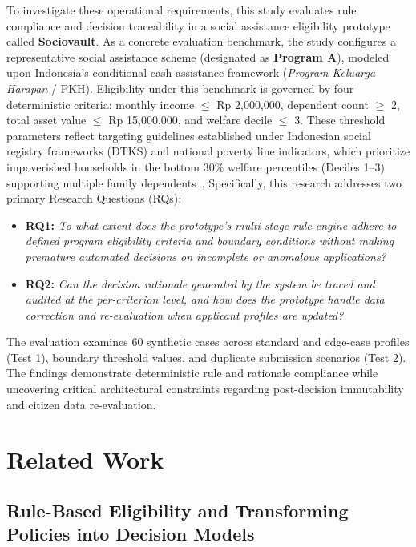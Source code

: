 \documentclass[runningheads]{llncs}
\begin{document}
To investigate these operational requirements, this study evaluates rule compliance and decision traceability in a social assistance eligibility prototype called \textbf{Sociovault}. As a concrete evaluation benchmark, the study configures a representative social assistance scheme (designated as \textbf{Program A}), modeled upon Indonesia's conditional cash assistance framework (\textit{Program Keluarga Harapan} / PKH). Eligibility under this benchmark is governed by four deterministic criteria: monthly income $\le$ Rp 2,000,000, dependent count $\ge$ 2, total asset value $\le$ Rp 15,000,000, and welfare decile $\le$ 3. These threshold parameters reflect targeting guidelines established under Indonesian social registry frameworks (DTKS) and national poverty line indicators, which prioritize impoverished households in the bottom 30\% welfare percentiles (Deciles 1--3) supporting multiple family dependents~\cite{hadiwidjaja2022improving}. Specifically, this research addresses two primary Research Questions (RQs):
\begin{itemize}
    \item \textbf{RQ1:} \textit{To what extent does the prototype's multi-stage rule engine adhere to defined program eligibility criteria and boundary conditions without making premature automated decisions on incomplete or anomalous applications?}
    \item \textbf{RQ2:} \textit{Can the decision rationale generated by the system be traced and audited at the per-criterion level, and how does the prototype handle data correction and re-evaluation when applicant profiles are updated?}
\end{itemize}

The evaluation examines 60 synthetic cases across standard and edge-case profiles (Test 1), boundary threshold values, and duplicate submission scenarios (Test 2). The findings demonstrate deterministic rule and rationale compliance while uncovering critical architectural constraints regarding post-decision immutability and citizen data re-evaluation.

\section{Related Work}

\subsection{Rule-Based Eligibility and Transforming Policies into Decision Models}
\end{document}
